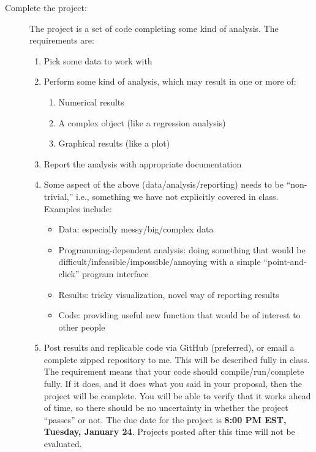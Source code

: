 \documentclass{tufte-handout}
\begin{document}
\begin{description}
\item[{Complete the project:}] The project is a set of code completing some kind of analysis. The requirements are:
\begin{enumerate}
\item Pick some data to work with
\item Perform some kind of analysis, which may result in one or more of:
\begin{enumerate}
\item Numerical results
\item A complex object (like a regression analysis)
\item Graphical results (like a plot)
\end{enumerate}
\item Report the analysis with appropriate documentation
\item Some aspect of the above (data/analysis/reporting) needs to be ``non-trivial,'' i.e., something we have not explicitly covered in class.  Examples include:
\begin{itemize}
\item Data: especially messy/big/complex data 
\item Programming-dependent analysis: doing something that would be difficult/infeasible/impossible/annoying with a simple ``point-and-click'' program interface 
\item Results: tricky visualization, novel way of reporting results 
\item Code: providing useful new function that would be of interest to other people 
\end{itemize}
\item Post results and replicable code via GitHub (preferred), or email a complete zipped repository to me. This will be described fully in class. The requirement means that your code should compile/run/complete fully. If it does, and it does what you said in your proposal, then the project will be complete.  You will be able to verify that it works ahead of time, so there should be no uncertainty in whether the project ``passes'' or not. The due date  for the project is \textbf{8:00 PM EST, Tuesday, January 24}. Projects posted after this time will not be evaluated.
\end{enumerate}
\end{description}
\end{document}
